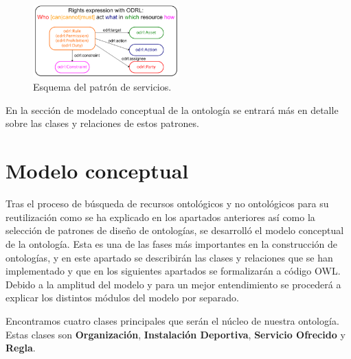 \documentclass[a4paper,12pt]{article}
\begin{document}
	\begin{figure}[H]
		\centering
		\includegraphics[width=0.5\textwidth]{include/patron_reglas.png}
		\caption{Esquema del patrón de servicios.}
	\end{figure}
	
	En la sección de modelado conceptual de la ontología se entrará más en detalle sobre las clases y
relaciones de estos patrones.
	
	\section{Modelo conceptual}
	
	Tras el proceso de búsqueda de recursos ontológicos y no ontológicos para su reutilización
como se ha explicado en los apartados anteriores así como la selección de patrones de diseño de
ontologías, se desarrolló el modelo conceptual de la ontología. Esta es una de las fases más
importantes en la construcción de ontologías, y en este apartado se describirán las
clases y relaciones que se han implementado y que en los siguientes apartados se formalizarán a
código OWL. Debido a la amplitud del modelo y para un mejor entendimiento se procederá a
explicar los distintos módulos del modelo por separado.
	
	Encontramos cuatro clases principales que serán el núcleo de nuestra ontología.
Estas clases son \textbf{Organización}, \textbf{Instalación Deportiva}, \textbf{Servicio Ofrecido} y \textbf{Regla}.
	
\end{document}

